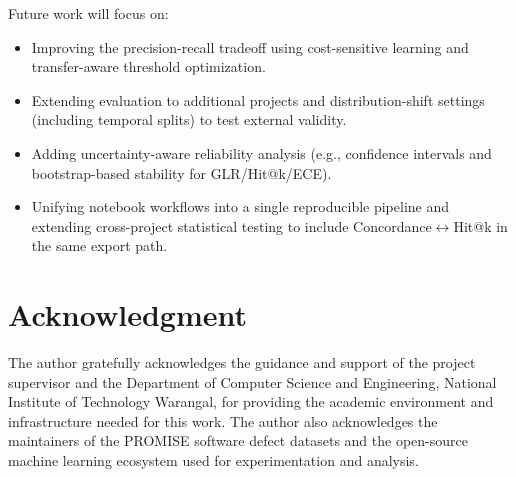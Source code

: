 \documentclass[conference]{IEEEtran}
\begin{document}
Future work will focus on:
\begin{itemize}
\item Improving the precision-recall tradeoff using cost-sensitive learning and transfer-aware threshold optimization.
\item Extending evaluation to additional projects and distribution-shift settings (including temporal splits) to test external validity.
\item Adding uncertainty-aware reliability analysis (e.g., confidence intervals and bootstrap-based stability for GLR/Hit@k/ECE).
\item Unifying notebook workflows into a single reproducible pipeline and extending cross-project statistical testing to include Concordance\(\leftrightarrow\)Hit@k in the same export path.
\end{itemize}

\section*{Acknowledgment}
The author gratefully acknowledges the guidance and support of the project supervisor and the Department of Computer Science and Engineering, National Institute of Technology Warangal, for providing the academic environment and infrastructure needed for this work. The author also acknowledges the maintainers of the PROMISE software defect datasets and the open-source machine learning ecosystem used for experimentation and analysis.
\end{document}
